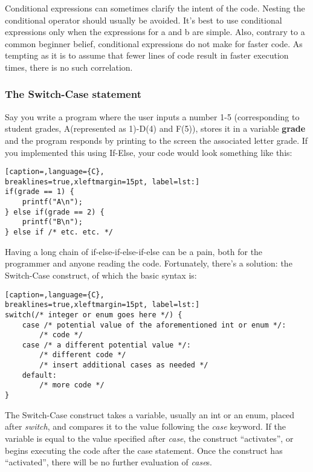 Conditional expressions can sometimes clarify the intent of the code. Nesting
the conditional operator should usually be avoided. It's best to use
conditional expressions only when the expressions for a and b are simple. Also,
contrary to a common beginner belief, conditional expressions do not make for
faster code. As tempting as it is to assume that fewer lines of code result in
faster execution times, there is no such correlation.

\subsubsection{The Switch-Case statement}
Say you write a program where the user inputs a number 1-5 (corresponding to
student grades, A(represented as 1)-D(4) and F(5)), stores it in a variable
\textbf{grade} and the program responds by printing to the screen the
associated letter grade. If you implemented this using If-Else, your code would
look something like this:

\lstset{basicstyle=\scriptsize, numbers=left, captionpos=b, tabsize=4}
\begin{lstlisting}[caption=,language={C},
breaklines=true,xleftmargin=15pt, label=lst:]
if(grade == 1) {
	printf("A\n");
} else if(grade == 2) {
	printf("B\n");
} else if /* etc. etc. */
\end{lstlisting}

Having a long chain of if-else-if-else-if-else can be a pain, both for the
programmer and anyone reading the code. Fortunately, there's a solution: the
Switch-Case construct, of which the basic syntax is:
\lstset{basicstyle=\scriptsize, numbers=left, captionpos=b, tabsize=4}
\begin{lstlisting}[caption=,language={C},
breaklines=true,xleftmargin=15pt, label=lst:]
switch(/* integer or enum goes here */) {
	case /* potential value of the aforementioned int or enum */:
		/* code */
	case /* a different potential value */:
		/* different code */
		/* insert additional cases as needed */
	default: 
		/* more code */
}
\end{lstlisting}

The Switch-Case construct takes a variable, usually an int or an enum, placed
after \emph{switch}, and compares it to the value following the \emph{case}
keyword. If the variable is equal to the value specified after \emph{case}, the
construct ``activates'', or begins executing the code after the case statement.
Once the construct has ``activated'', there will be no further evaluation of
\emph{case}s. 

